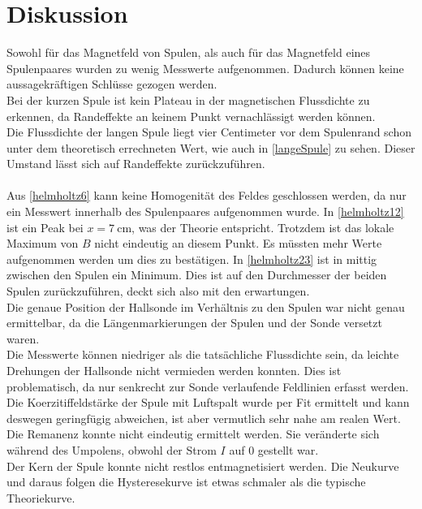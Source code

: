 \section{Diskussion}
\label{sec:Diskussion}

Sowohl für das Magnetfeld von Spulen, als auch für das Magnetfeld eines Spulenpaares wurden zu wenig Messwerte aufgenommen.
Dadurch können keine aussagekräftigen Schlüsse gezogen werden.\\
Bei der kurzen Spule ist kein Plateau in der magnetischen Flussdichte zu erkennen, da Randeffekte an keinem
Punkt vernachlässigt werden können. \\
Die Flussdichte der langen Spule liegt vier Centimeter vor dem Spulenrand schon unter dem theoretisch errechneten Wert, wie auch in
\autoref{langeSpule} zu sehen. Dieser Umstand lässt sich auf Randeffekte zurückzuführen.\\
\\
Aus \autoref{helmholtz6} kann keine Homogenität des Feldes geschlossen werden, da nur ein Messwert innerhalb des
Spulenpaares aufgenommen wurde. In \autoref{helmholtz12} ist ein Peak bei $x = \SI{7}{\centi\meter}$, was der Theorie entspricht.
Trotzdem ist das lokale Maximum von $B$ nicht eindeutig an diesem Punkt. Es müssten mehr Werte aufgenommen werden um dies zu bestätigen.
In \autoref{helmholtz23} ist in mittig zwischen den Spulen ein Minimum. Dies ist auf den Durchmesser der beiden Spulen 
zurückzuführen, deckt sich also mit den erwartungen.\\
Die genaue Position der Hallsonde im Verhältnis zu den Spulen war nicht genau ermittelbar, da die Längenmarkierungen der Spulen und der Sonde
versetzt waren.\\
Die Messwerte können niedriger als die tatsächliche Flussdichte sein, da leichte Drehungen der Hallsonde nicht vermieden werden konnten.
Dies ist problematisch, da nur senkrecht zur Sonde verlaufende Feldlinien erfasst werden.
\\
Die Koerzitiffeldstärke der Spule mit Luftspalt wurde per Fit ermittelt und kann deswegen geringfügig abweichen, ist aber 
vermutlich sehr nahe am realen Wert.\\
Die Remanenz konnte nicht eindeutig ermittelt werden. Sie veränderte sich während des Umpolens, obwohl der Strom $I$ auf 0 gestellt war.\\
Der Kern der Spule konnte nicht restlos entmagnetisiert werden. Die Neukurve und daraus folgen die Hysteresekurve ist etwas schmaler als die typische Theoriekurve.\\



\newpage